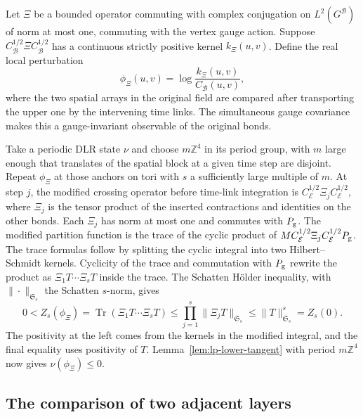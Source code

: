 \documentclass[11pt,letterpaper,reqno]{amsart}
\numberwithin{equation}{section}
\theoremstyle{definition}
\theoremstyle{remark}
\begin{document}
Let \(\Xi\) be a bounded operator commuting with complex conjugation on
\(L^2(G^{\mathcal B})\) of norm at most one, commuting with the
vertex gauge action. Suppose \(C_{\mathcal B}^{1/2}\Xi
C_{\mathcal B}^{1/2}\) has a continuous strictly positive kernel
\(k_\Xi(u,v)\). Define the real local perturbation
\begin{equation}\label{eq:lp-transfer-perturbation}
 \phi_\Xi(u,v)=\log\frac{k_\Xi(u,v)}{C_{\mathcal B}(u,v)},
\end{equation}
where the two spatial arrays in the original field are compared
after transporting the upper one by the intervening time links.
The simultaneous gauge covariance makes this a gauge-invariant
observable of the original bonds.

Take a periodic DLR state \(\nu\) and choose \(m\mathbb Z^4\)
in its period group, with \(m\) large enough that translates
of the spatial block at a given time step are disjoint. Repeat
\(\phi_\Xi\) at those anchors on tori with \(s\) a sufficiently
large multiple of \(m\). At step \(j\), the modified crossing
operator before time-link integration is
\(C_{\mathcal E}^{1/2}\Xi_j C_{\mathcal E}^{1/2}\), where \(\Xi_j\)
is the tensor product of the inserted contractions and identities
on the other bonds. Each \(\Xi_j\) has norm at most one and
commutes with \(P_{\rm g}\). The modified partition function is the trace of the
cyclic product of \(M C_{\mathcal E}^{1/2}\Xi_j C_{\mathcal E}^{1/2}P_{\rm g}\).
The trace formulas follow by splitting the cyclic integral into
two Hilbert--Schmidt kernels. Cyclicity of the trace and
commutation with \(P_{\rm g}\) rewrite the product as \(\Xi_1T\cdots\Xi_sT\)
inside the trace. The Schatten H\"older inequality, with
\(\|\cdot\|_{\mathfrak S_s}\) the Schatten \(s\)-norm, gives
\begin{equation}\label{eq:lp-transfer-contraction}
 0<Z_s(\phi_\Xi)=\operatorname{Tr}(\Xi_1T\cdots\Xi_sT)
 \le\prod_{j=1}^s\|\Xi_jT\|_{\mathfrak S_s}
 \le\|T\|_{\mathfrak S_s}^s=Z_s(0).
\end{equation}
The positivity at the left comes from the kernels in the modified
integral, and the final equality uses positivity of \(T\).
Lemma~\ref{lem:lp-lower-tangent} with period \(m\mathbb Z^4\)
now gives \(\nu(\phi_\Xi)\le0\).

\subsection{The comparison of two adjacent layers}
\end{document}
